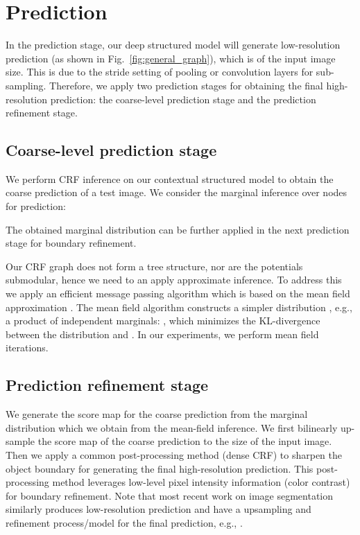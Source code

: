 \section{Prediction}
\label{sec:prediction}

In the prediction stage,
our deep structured model will generate low-resolution prediction (as shown in Fig.~\ref{fig:general_graph}), 
which is  of the input image size.
This is due to the stride setting of pooling or convolution layers for sub-sampling.
Therefore, we apply two prediction stages for obtaining the final high-resolution prediction: 
the coarse-level prediction stage and the prediction refinement stage.


\subsection{Coarse-level prediction stage}
We perform CRF inference on our contextual structured model to obtain the coarse prediction of a test image.
We consider the marginal inference over nodes for prediction:

The obtained marginal distribution can be further applied in the next prediction stage for boundary refinement.

Our CRF graph does not form a tree structure,
nor are the potentials submodular,
hence we need to an apply approximate inference.
To address this we
apply an efficient  message passing algorithm which is based on the mean field approximation \cite{Nowozinstruct}.
The mean field algorithm constructs a simpler distribution , e.g.,
a product of independent marginals: 
, 
which minimizes the KL-divergence between the distribution  and .
In our experiments, we perform  mean field iterations.


\subsection{Prediction refinement stage}
We generate the score map for the coarse prediction from the marginal distribution which we obtain from the mean-field inference.
We first bilinearly up-sample the score map of the coarse prediction to the size of the input image.
Then we apply a common post-processing method \cite{krahenbuhl2012efficient} (dense CRF)
to sharpen the object boundary for generating the final high-resolution prediction.
This post-processing method leverages low-level pixel intensity information (color contrast) for boundary refinement. 
Note that most recent work on image segmentation similarly produces low-resolution prediction
 and have a upsampling and refinement process/model for the final prediction, e.g., 
\cite{ChenPKMY14,zheng2015conditional,Dai2015arXiv}.

